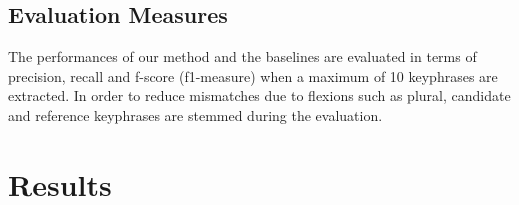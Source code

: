   \subsection{Evaluation Measures}
  \label{subsec:evaluation_measures}
    The performances of our method and the baselines are evaluated in terms of
    precision, recall and f-score (f1-measure) when a maximum of 10 keyphrases
    are extracted. In order to reduce mismatches due to flexions such as plural,
    candidate and reference keyphrases are stemmed during the evaluation.

\section{Results}
\label{sec:results}


